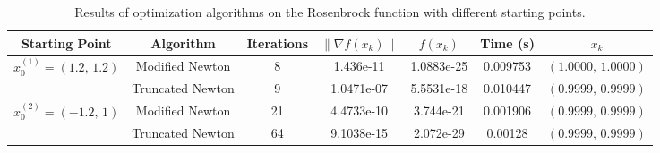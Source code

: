 \begin{table}
    \centering
    \begin{tabular}{c|c|c|c|c|c|c}
        \toprule
        Starting Point & Algorithm & Iterations & $\| \nabla f(x_k) \|$ & $f(x_k)$ & Time (s) & $x_k$ \\
        \midrule
        \multirow{2}{*}{$x_0^{(1)} = (1.2,\, 1.2)$} & Modified Newton & 8 & 1.436e-11 & 1.0883e-25 & 0.009753 & $(1.0000,\, 1.0000)$ \\
        & Truncated Newton & 9 & 1.0471e-07 & 5.5531e-18 & 0.010447 & $(0.9999,\, 0.9999)$ \\ \midrule
        \multirow{2}{*}{$x_0^{(2)} = (-1.2,\, 1)$} & Modified Newton & 21 & 4.4733e-10 & 3.744e-21 & 0.001906 & $(0.9999,\, 0.9999)$ \\
        & Truncated Newton & 64 & 9.1038e-15 & 2.072e-29 & 0.00128 & $(0.9999,\, 0.9999)$\\
        \bottomrule
    \end{tabular}
    \caption{Results of optimization algorithms on the Rosenbrock function with different starting points.}
    \label{tab:rosenbrock_results}
\end{table}

